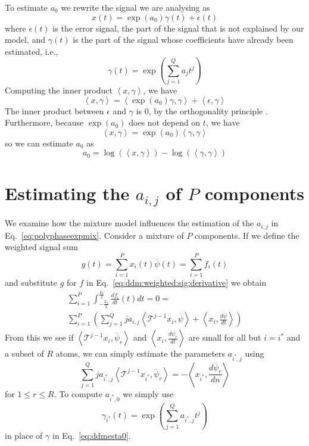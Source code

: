 \documentclass[twoside,a4paper]{article}
\begin{document}
To estimate $a_0$ we rewrite the signal we are analysing as
\[
    x(t) = \exp(a_0) \gamma(t) + \epsilon (t)
\]
where $\epsilon (t)$ is the error signal, the part of the signal that is not explained
by our model, and $\gamma (t)$ is the part of the signal
whose coefficients have already been estimated, i.e.,
\[
    \gamma(t) = \exp \left( \sum_{j=1}^{Q} a_j t^{j} \right)
\]
Computing the inner product $\left\langle x , \gamma \right\rangle$, we have
\[
    \left\langle x , \gamma \right\rangle
    =
    \left\langle \exp(a_0) \gamma , \gamma \right\rangle + 
        \left\langle \epsilon , \gamma \right\rangle
\]
The inner product between $\epsilon$ and $\gamma$ is $0$, by the orthogonality
principle \cite[ch.~12]{kay1993fundamentals}. Furthermore, because $\exp(a_0)$ does not
depend on $t$, we have
\[
    \left\langle x , \gamma \right\rangle
    =
    \exp(a_0) \left\langle \gamma , \gamma \right\rangle
\]
so we can estimate $a_0$ as
\begin{equation}
    \label{eq:ddmesta0}
    a_0 = \log \left( \left\langle x , \gamma \right\rangle \right)
        - \log \left( \left\langle \gamma , \gamma \right\rangle \right)
\end{equation}

\section{Estimating the \lowercase{$a_{i,j}$} of $P$ components}

We examine how the mixture model influences the estimation of the $a_{i,j}$ in
Eq.~\ref{eq:polyphaseexpmix}.
Consider a mixture of $P$ components.
If we define the weighted signal sum
%
\[
    g(t) = \sum_{i=1}^{P} x_{i}(t) \overline{\psi}(t) = \sum_{i=1}^{P} f_{i}(t)
\]
%
and substitute $g$ for $f$ in Eq.~\ref{eq:ddm:weighted:sig:derivative} we obtain
%
\begin{multline}
    \label{eq:mixest}
    \sum_{i=1}^{P} \int_{-\frac{L_{t}}{2}}^{\frac{L_{t}}{2}}
    \frac{df_{i}}{dt}(t)dt =
    0
    = \\ 
    \sum_{i=1}^{P} \left(
    \sum_{j=1}^{Q} j a_{i,j} 
    \left\langle \mathcal{T}^{j-1} x_i , \overline{\psi} \right\rangle
    + \left\langle x_i, \frac{d\overline{\psi}}{dt} \right\rangle \right)
\end{multline}
%
From this we see if $\left\langle \mathcal{T}^{j-1} x_i , \overline{\psi}_{r}
\right\rangle$ and $\left\langle x_i, \frac{d\overline{\psi_{r}}}{dt} \right\rangle$
are small for all but $i = i^{\ast}$ and a subset of $R$ atoms, we
can simply estimate the parameters $a_{i^{\ast},j}$ using
\[
    \sum_{j=1}^{Q} j a_{{i^{\ast}},j} 
    \left\langle \mathcal{T}^{j-1} x_{i^{\ast}} , \overline{\psi}_{r} \right\rangle
    = -\left\langle x_{i^{\ast}}, \frac{d\overline{\psi}_{r}}{dn} \right\rangle
\]
for $1 \leq r \leq R$. To compute $a_{i^{\ast},0}$ we simply use
\[
    \gamma_{i^{\ast}}(t) = \exp \left( \sum_{j=1}^{Q} a_{i^{\ast},j} t^{j} \right)
\]
in place of $\gamma$ in Eq.~\ref{eq:ddmesta0}.
\end{document}
